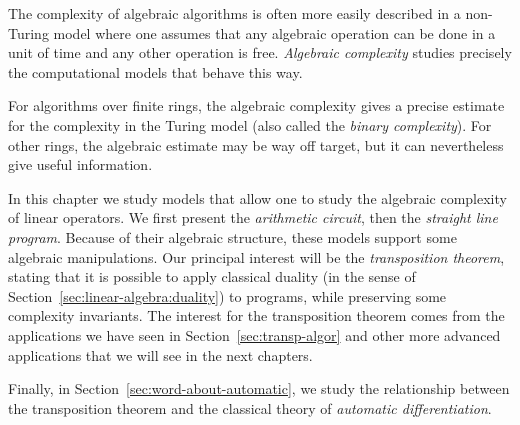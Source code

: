 The complexity of algebraic algorithms is often more easily described
in a non-Turing model where one assumes that any algebraic operation
can be done in a unit of time and any other operation is
free. \emph{Algebraic complexity} studies precisely the computational
models that behave this way.

For algorithms over finite rings, the algebraic complexity gives a
precise estimate for the complexity in the Turing model (also called
the \emph{binary complexity}). For other rings, the algebraic estimate
may be way off target, but it can nevertheless give useful information.

In this chapter we study models that allow one to study the algebraic
complexity of linear operators. We first present the \emph{arithmetic
  circuit}, then the \emph{straight line program}. Because of their
algebraic structure, these models support some algebraic
manipulations.  Our principal interest will be the \emph{transposition
  theorem}, stating that it is possible to apply classical duality (in
the sense of Section~\ref{sec:linear-algebra:duality}) to programs,
while preserving some complexity invariants. The interest for the
transposition theorem comes from the applications we have seen in
Section~\ref{sec:transp-algor} and other more advanced applications
that we will see in the next chapters.

Finally, in Section~\ref{sec:word-about-automatic}, we study the
relationship between the transposition theorem and the classical
theory of \emph{automatic differentiation}.



%
